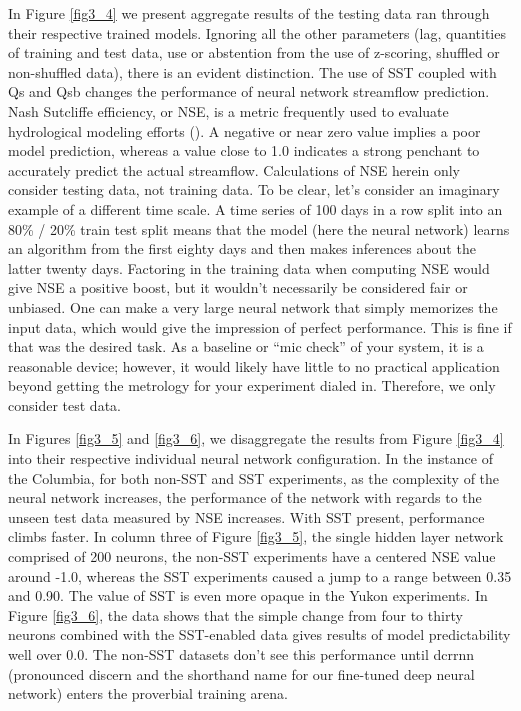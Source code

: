 \begin{refsection}
In Figure \ref{fig3_4} we present aggregate results of the testing data ran through their respective trained models. Ignoring all the other parameters (lag, quantities of training and test data, use or abstention from the use of z-scoring, shuffled or non-shuffled data), there is an evident distinction. The use of SST coupled with Qs and Qsb changes the performance of neural network streamflow prediction. Nash Sutcliffe efficiency, or NSE, is a metric frequently used to evaluate hydrological modeling efforts (\cite{nash1970river}). A negative or near zero value implies a poor model prediction, whereas a value close to 1.0 indicates a strong penchant to accurately predict the actual streamflow. Calculations of NSE herein only consider testing data, not training data. To be clear, let’s consider an imaginary example of a different time scale. A time series of 100 days in a row split into an 80\% / 20\% train test split means that the model (here the neural network) learns an algorithm from the first eighty days and then makes inferences about the latter twenty days. Factoring in the training data when computing NSE would give NSE a positive boost, but it wouldn’t necessarily be considered fair or unbiased. One can make a very large neural network that simply memorizes the input data, which would give the impression of perfect performance. This is fine if that was the desired task. As a baseline or “mic check” of your system, it is a reasonable device; however, it would likely have little to no practical application beyond getting the metrology for your experiment dialed in. Therefore, we only consider test data.

In Figures \ref{fig3_5} and \ref{fig3_6}, we disaggregate the results from Figure \ref{fig3_4} into their respective individual neural network configuration. In the instance of the Columbia, for both non-SST and SST experiments, as the complexity of the neural network increases, the performance of the network with regards to the unseen test data measured by NSE increases. With SST present, performance climbs faster. In column three of Figure \ref{fig3_5}, the single hidden layer network comprised of 200 neurons, the non-SST experiments have a centered NSE value around -1.0, whereas the SST experiments caused a jump to a range between 0.35 and 0.90. The value of SST is even more opaque in the Yukon experiments. In Figure \ref{fig3_6}, the data shows that the simple change from four to thirty neurons combined with the SST-enabled data gives results of model predictability well over 0.0. The non-SST datasets don’t see this performance until dcrrnn (pronounced discern and the shorthand name for our fine-tuned deep neural network) enters the proverbial training arena. 


\end{refsection}
